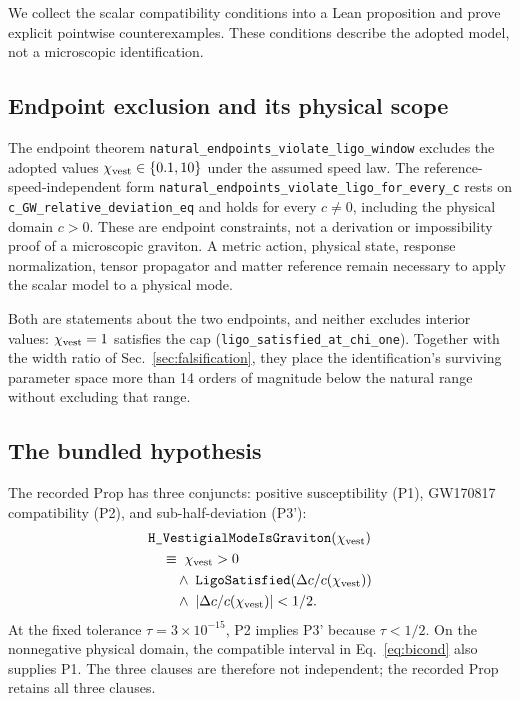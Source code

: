 \documentclass[aps,prd,twocolumn,showpacs,superscriptaddress,nofootinbib]{revtex4-2}
\newcommand{\chivest}{\chi_{\rm vest}}
\newcommand{\dccap}{\Delta c/c}
\begin{document}
We collect the scalar compatibility conditions into a Lean
proposition and prove explicit pointwise counterexamples. These
conditions describe the adopted model, not a microscopic identification.

\subsection{Endpoint exclusion and its physical scope}

The endpoint theorem
\verb|natural_endpoints_violate_ligo_window| excludes the
adopted values $\chivest\in\{0.1,10\}$ under the assumed speed
law. The reference-speed-independent form
\verb|natural_endpoints_violate_ligo_for_every_c| rests on
\verb|c_GW_relative_deviation_eq| and holds for every $c\ne0$,
including the physical domain $c>0$.
These are endpoint constraints, not a derivation or impossibility
proof of a microscopic graviton. A metric action, physical state,
response normalization, tensor propagator and matter reference
remain necessary to apply the scalar model to a physical mode.

Both are statements about the two endpoints, and neither excludes
interior values: $\chivest = 1$ satisfies the cap
(\verb|ligo_satisfied_at_chi_one|). Together with the width ratio of
Sec.~\ref{sec:falsification}, they place the identification's
surviving parameter space more than 14 orders of magnitude below the
natural range without excluding that range.

\subsection{The bundled hypothesis}

The recorded Prop has three conjuncts: positive susceptibility
(P1), GW170817 compatibility (P2), and sub-half-deviation (P3'):
\begin{equation*}
\begin{aligned}
&\verb|H_VestigialModeIsGraviton|(\chivest) \\
&\quad\equiv\; \chivest > 0 \\
&\qquad\wedge\; \verb|LigoSatisfied|(\dccap(\chivest)) \\
&\qquad\wedge\; |\dccap(\chivest)| < 1/2.
\end{aligned}
\end{equation*}
At the fixed tolerance $\tau=3\times10^{-15}$, P2 implies P3'
because $\tau<1/2$. On the nonnegative physical domain, the
compatible interval in Eq.~\eqref{eq:bicond} also supplies P1.
The three clauses are therefore not independent; the recorded Prop
retains all three clauses.
\end{document}

